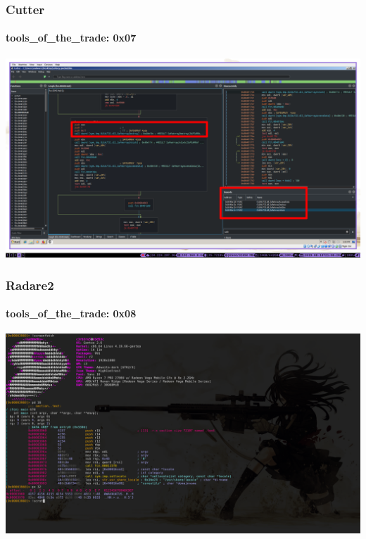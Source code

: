 \documentclass[aspectratio=169]{beamer}
\begin{document}
\begin{frame}
  \frametitle{Cutter}
  \framesubtitle{tools\_of\_the\_trade: 0x07}
  \begin{center}
    \includegraphics[scale=0.75]{cutter-navigation}
  \end{center}
\end{frame}

\begin{frame}
  \frametitle{Radare2}
  \framesubtitle{tools\_of\_the\_trade: 0x08}
  \begin{center}
    \includegraphics[scale=0.18]{radare2}
  \end{center}
\end{frame}
\end{document}
